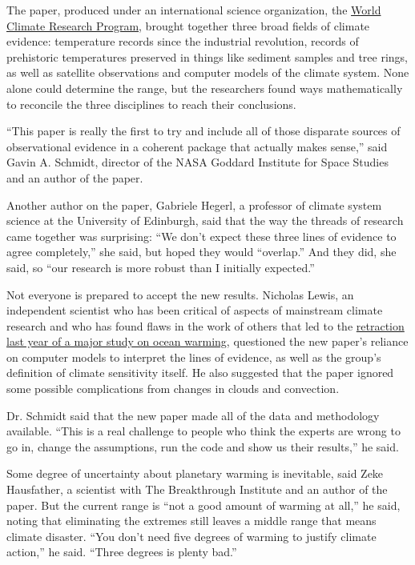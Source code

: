 The paper, produced under an international science organization, the
\href{https://www.wcrp-climate.org/}{World Climate Research Program},
brought together three broad fields of climate evidence: temperature
records since the industrial revolution, records of prehistoric
temperatures preserved in things like sediment samples and tree rings,
as well as satellite observations and computer models of the climate
system. None alone could determine the range, but the researchers found
ways mathematically to reconcile the three disciplines to reach their
conclusions.

``This paper is really the first to try and include all of those
disparate sources of observational evidence in a coherent package that
actually makes sense,'' said Gavin A. Schmidt, director of the NASA
Goddard Institute for Space Studies and an author of the paper.

Another author on the paper, Gabriele Hegerl, a professor of climate
system science at the University of Edinburgh, said that the way the
threads of research came together was surprising: ``We don't expect
these three lines of evidence to agree completely,'' she said, but hoped
they would ``overlap.'' And they did, she said, so ``our research is
more robust than I initially expected.''

Not everyone is prepared to accept the new results. Nicholas Lewis, an
independent scientist who has been critical of aspects of mainstream
climate research and who has found flaws in the work of others that led
to the
\href{https://www.sciencemag.org/news/2018/11/high-profile-ocean-warming-paper-get-correction}{retraction
last year of a major study on ocean warming}, questioned the new paper's
reliance on computer models to interpret the lines of evidence, as well
as the group's definition of climate sensitivity itself. He also
suggested that the paper ignored some possible complications from
changes in clouds and convection.

Dr. Schmidt said that the new paper made all of the data and methodology
available. ``This is a real challenge to people who think the experts
are wrong to go in, change the assumptions, run the code and show us
their results,'' he said.

Some degree of uncertainty about planetary warming is inevitable, said
Zeke Hausfather, a scientist with The Breakthrough Institute and an
author of the paper. But the current range is ``not a good amount of
warming at all,'' he said, noting that eliminating the extremes still
leaves a middle range that means climate disaster. ``You don't need five
degrees of warming to justify climate action,'' he said. ``Three degrees
is plenty bad.''

